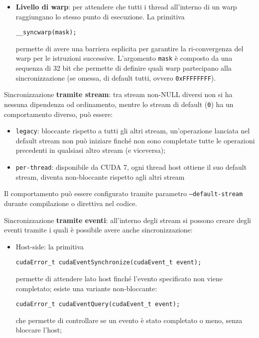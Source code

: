 \begin{questions}
\begin{solution}
\begin{itemize}
            \item \textbf{Livello di warp}: per attendere che tutti i thread all'interno di un warp raggiungano lo stesso punto di esecuzione. La primitiva
            \begin{verbatim}
__syncwarp(mask);
            \end{verbatim}
            permette di avere una barriera esplicita per garantire la ri-convergenza del warp per le istruzioni successive. L'argomento \texttt{mask} è composto da una sequenza di 32 bit che permette di definire quali warp partecipano alla sincronizzazione (se omessa, di default tutti, ovvero \texttt{0xFFFFFFFF}).
        \end{itemize}
        
        Sincronizzazione \textbf{tramite stream}: tra stream non-NULL diversi non si ha nessuna dipendenza od ordinamento, mentre lo stream di default (\texttt{0}) ha un comportamento diverso, può essere: 
        \begin{itemize}
            \item \texttt{legacy}: bloccante rispetto a tutti gli altri stream, un'operazione lanciata nel default stream non può iniziare finché non sono completate tutte le operazioni precedenti in qualsiasi altro stream (e viceversa);
            
            \item \texttt{per-thread}: disponibile da CUDA 7, ogni thread host ottiene il suo default stream, diventa non-bloccante rispetto agli altri stream
        \end{itemize}
        Il comportamento può essere configurato tramite parametro \texttt{--default-stream} durante compilazione o direttiva nel codice.
        
        Sincronizzazione \textbf{tramite eventi}: all'interno degli stream si possono creare degli eventi tramite i quali è possibile avere anche sincronizzazione:
        \begin{itemize}
            \item Host-side: la primitiva
            \begin{verbatim}
cudaError_t cudaEventSynchronize(cudaEvent_t event);
            \end{verbatim}
            permette di attendere lato host finché l'evento specificato non viene completato; esiste una variante non-bloccante:
            \begin{verbatim}
cudaError_t cudaEventQuery(cudaEvent_t event);
            \end{verbatim}
            che permette di controllare se un evento è stato completato o meno, senza bloccare l'host;
            

\end{itemize}
\end{solution}
\end{questions}
